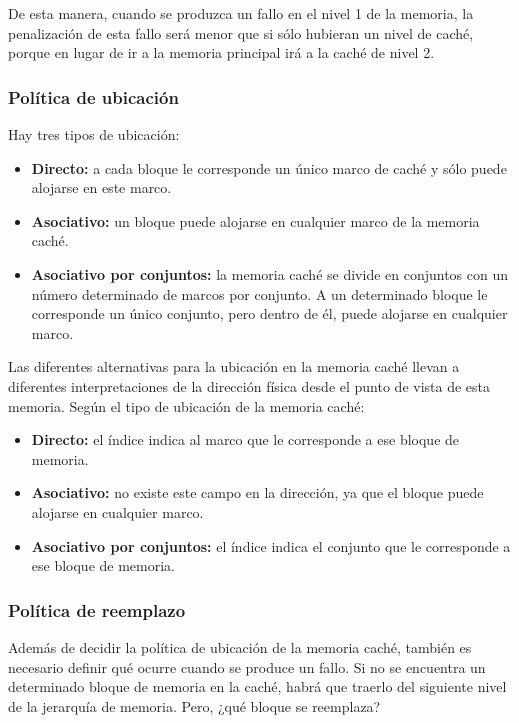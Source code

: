 De esta manera, cuando se produzca un fallo en el nivel 1 de la memoria, la penalización de esta fallo será menor que si sólo hubieran un nivel de caché, porque en lugar de ir a la memoria principal irá a la caché de nivel 2.

\subsubsection*{Política de ubicación}

Hay tres tipos de ubicación:

\begin{itemize}
  \item \textbf{Directo:} a cada bloque le corresponde un único marco de caché y sólo puede alojarse en este marco.
  \item \textbf{Asociativo:} un bloque puede alojarse en cualquier marco de la memoria caché.
  \item \textbf{Asociativo por conjuntos:} la memoria caché se divide en conjuntos con un número determinado de marcos por conjunto. A un determinado bloque le corresponde un único conjunto, pero dentro de él, puede alojarse en cualquier marco.
\end{itemize}

Las diferentes alternativas para la ubicación en la memoria caché llevan a diferentes interpretaciones de la dirección física desde el punto de vista de esta memoria. Según el tipo de ubicación de la memoria caché:

\begin{itemize}
  \item \textbf{Directo:} el índice indica al marco que le corresponde a ese bloque de memoria.
  \item \textbf{Asociativo:} no existe este campo en la dirección, ya que el bloque puede alojarse en cualquier marco.
  \item \textbf{Asociativo por conjuntos:} el índice indica el conjunto que le corresponde a ese bloque de memoria.
\end{itemize}

\subsubsection*{Política de reemplazo}

Además de decidir la política de ubicación de la memoria caché, también es necesario definir qué ocurre cuando se produce un fallo. Si no se encuentra un determinado bloque de memoria en la caché, habrá que traerlo del siguiente nivel de la jerarquía de memoria. Pero, ¿qué bloque se reemplaza?

